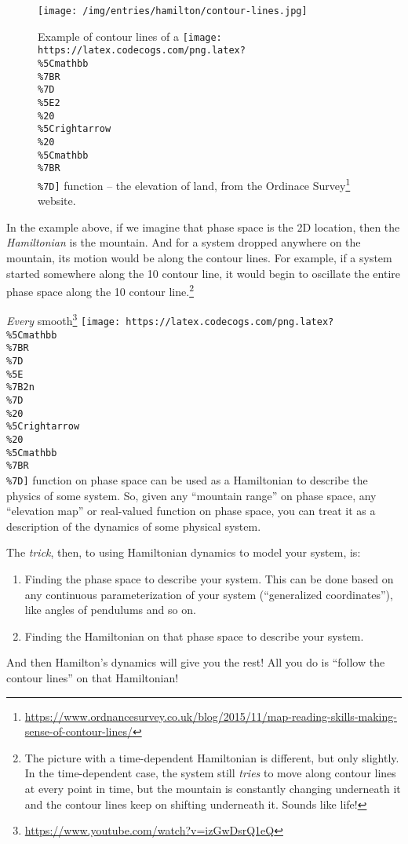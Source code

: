 \documentclass[]{article}
\renewcommand{\href}[2]{#2\footnote{\url{#1}}}
\begin{document}
\begin{figure}
\centering
\texttt{[image: /img/entries/hamilton/contour-lines.jpg]}
\caption{Example of contour lines of a
\texttt{[image: https://latex.codecogs.com/png.latex?\\\%5Cmathbb\\\%7BR\\\%7D\\\%5E2\\\%20\\\%5Crightarrow\\\%20\\\%5Cmathbb\\\%7BR\\\%7D]}
function -- the elevation of land, from the
\href{https://www.ordnancesurvey.co.uk/blog/2015/11/map-reading-skills-making-sense-of-contour-lines/}{Ordinace
Survey} website.}
\end{figure}

In the example above, if we imagine that phase space is the 2D location, then
the \emph{Hamiltonian} is the mountain. And for a system dropped anywhere on the
mountain, its motion would be along the contour lines. For example, if a system
started somewhere along the 10 contour line, it would begin to oscillate the
entire phase space along the 10 contour line.\footnote{The picture with a
  time-dependent Hamiltonian is different, but only slightly. In the
  time-dependent case, the system still \emph{tries} to move along contour lines
  at every point in time, but the mountain is constantly changing underneath it
  and the contour lines keep on shifting underneath it. Sounds like life!}

\emph{Every} \href{https://www.youtube.com/watch?v=izGwDsrQ1eQ}{smooth}
\texttt{[image: https://latex.codecogs.com/png.latex?\\\%5Cmathbb\\\%7BR\\\%7D\\\%5E\\\%7B2n\\\%7D\\\%20\\\%5Crightarrow\\\%20\\\%5Cmathbb\\\%7BR\\\%7D]}
function on phase space can be used as a Hamiltonian to describe the physics of
some system. So, given any ``mountain range'' on phase space, any ``elevation
map'' or real-valued function on phase space, you can treat it as a description
of the dynamics of some physical system.

The \emph{trick}, then, to using Hamiltonian dynamics to model your system, is:

\begin{enumerate}
\def\labelenumi{\arabic{enumi}.}
\item
  Finding the phase space to describe your system. This can be done based on any
  continuous parameterization of your system (``generalized coordinates''), like
  angles of pendulums and so on.
\item
  Finding the Hamiltonian on that phase space to describe your system.
\end{enumerate}

And then Hamilton's dynamics will give you the rest! All you do is ``follow the
contour lines'' on that Hamiltonian!
\end{document}
